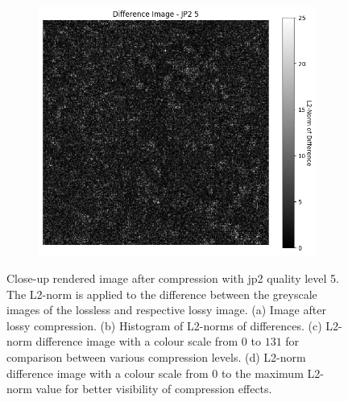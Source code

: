\begin{figure}[htb]
\begin{subfigure}[b]{0.48\textwidth}
        \caption{}
        \label{fig:img_quality_comp_jp2_5_center_diff}
    \end{subfigure}
    \begin{subfigure}[b]{0.48\textwidth}
        \centering
        \includegraphics[width=\textwidth]{doc/thesis/0_figures/compare_quality/set1/jp2_5_center_diff_heatmap_rel.png}
        \caption{}
        \label{fig:img_quality_comp_jp2_5_center_diff_rel}
    \end{subfigure}
    \caption{Close-up rendered image after compression with \gls{jp2} quality level 5. The L2-norm is applied to the difference between the greyscale images of the lossless and respective lossy image. (a) Image after lossy compression. (b) Histogram of L2-norms of differences. (c) L2-norm difference image with a colour scale from $0$ to $131$ for comparison between various compression levels. (d) L2-norm difference image with a colour scale from $0$ to the maximum L2-norm value for better visibility of compression effects.}
    \label{fig:img_quality_comp_jp2_5_center}
\end{figure}

